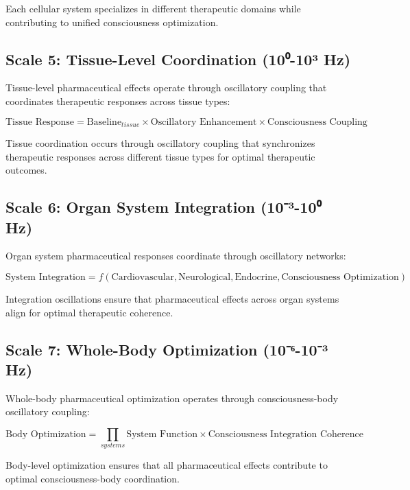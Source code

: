 \documentclass[12pt,a4paper]{article}
\begin{document}
Each cellular system specializes in different therapeutic domains while contributing to unified consciousness optimization.

\subsection{Scale 5: Tissue-Level Coordination (10⁰-10³ Hz)}

Tissue-level pharmaceutical effects operate through oscillatory coupling that coordinates therapeutic responses across tissue types:

\begin{equation}
\text{Tissue Response} = \text{Baseline}_{tissue} \times \text{Oscillatory Enhancement} \times \text{Consciousness Coupling}
\end{equation}

Tissue coordination occurs through oscillatory coupling that synchronizes therapeutic responses across different tissue types for optimal therapeutic outcomes.

\subsection{Scale 6: Organ System Integration (10⁻³-10⁰ Hz)}

Organ system pharmaceutical responses coordinate through oscillatory networks:

\begin{equation}
\text{System Integration} = f(\text{Cardiovascular}, \text{Neurological}, \text{Endocrine}, \text{Consciousness Optimization})
\end{equation}

Integration oscillations ensure that pharmaceutical effects across organ systems align for optimal therapeutic coherence.

\subsection{Scale 7: Whole-Body Optimization (10⁻⁶-10⁻³ Hz)}

Whole-body pharmaceutical optimization operates through consciousness-body oscillatory coupling:

\begin{equation}
\text{Body Optimization} = \prod_{systems} \text{System Function} \times \text{Consciousness Integration Coherence}
\end{equation}

Body-level optimization ensures that all pharmaceutical effects contribute to optimal consciousness-body coordination.
\end{document}
